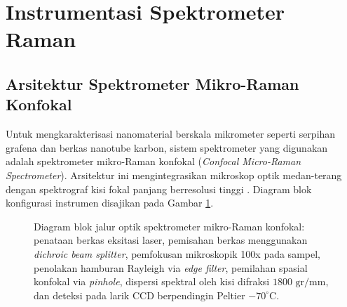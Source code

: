 \section{Instrumentasi Spektrometer Raman}
\label{sec:instrumentasi}

\subsection{Arsitektur Spektrometer Mikro-Raman Konfokal}
Untuk mengkarakterisasi nanomaterial berskala mikrometer seperti serpihan grafena dan berkas nanotube karbon, sistem spektrometer yang digunakan adalah spektrometer mikro-Raman konfokal (\textit{Confocal Micro-Raman Spectrometer}). Arsitektur ini mengintegrasikan mikroskop optik medan-terang dengan spektrograf kisi fokal panjang berresolusi tinggi \cite{smith2019modern}. Diagram blok konfigurasi instrumen disajikan pada Gambar \ref{fig:spectrometer_block}.

\begin{figure}[htbp]
\centering
\resizebox{0.85\textwidth}{!}{}
\caption{Diagram blok jalur optik spektrometer mikro-Raman konfokal: penataan berkas eksitasi laser, pemisahan berkas menggunakan \textit{dichroic beam splitter}, pemfokusan mikroskopik 100x pada sampel, penolakan hamburan Rayleigh via \textit{edge filter}, pemilahan spasial konfokal via \textit{pinhole}, dispersi spektral oleh kisi difraksi $1800\text{ gr/mm}$, dan deteksi pada larik CCD berpendingin Peltier $-70^\circ\text{C}$.}
\label{fig:spectrometer_block}
\end{figure}

